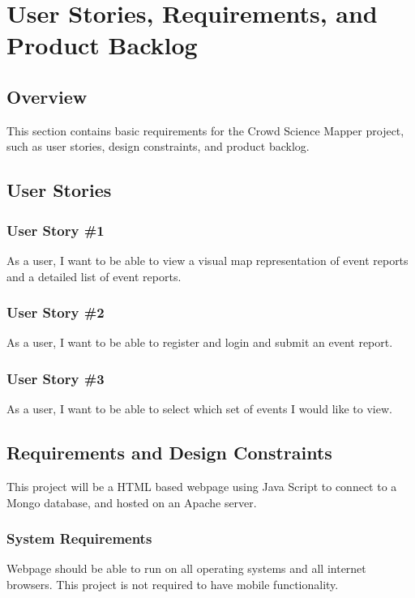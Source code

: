 
\chapter{User Stories,  Requirements, and Product Backlog}
\section{Overview}

This section contains basic requirements for the Crowd Science Mapper project, such as user stories, design constraints, and product backlog. 

\section{User Stories}

\subsection{User Story \#1}
As a user, I want to be able to view a visual map representation of event reports and a detailed list of event reports.

\subsection{User Story \#2} 
As a user, I want to be able to register and login and submit an event report.

\subsection{User Story \#3} 
As a user, I want to be able to select which set of events I would like to view.

\section{Requirements and Design Constraints}
This project will be a HTML based webpage using Java Script to connect to a Mongo database, and hosted on an Apache server.

\subsection{System  Requirements}
Webpage should be able to run on all operating systems and all internet browsers. This project is not required to have mobile functionality. 

